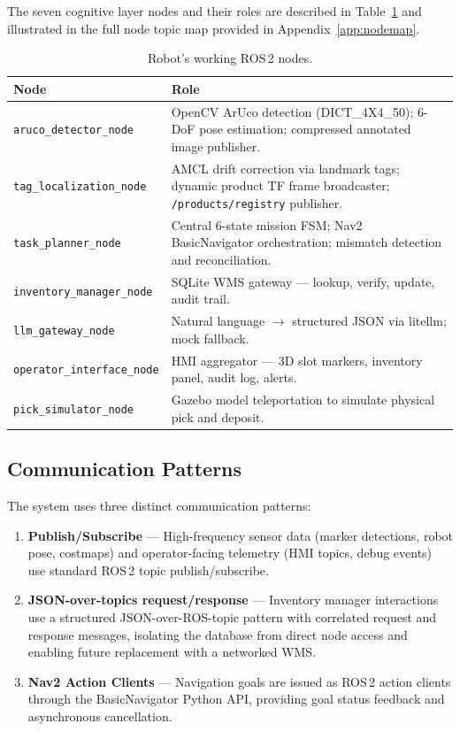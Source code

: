 \documentclass[12pt,a4paper]{report}
\begin{document}
The seven cognitive layer nodes and their roles are described in Table~\ref{tab:nodes} and illustrated in the full node topic map provided in Appendix~\ref{app:nodemap}.

\begin{table}[H]
\centering
\caption{Robot's working ROS\,2 nodes.}
\label{tab:nodes}
\begin{tabular}{p{6cm}>{\raggedright\arraybackslash}p{9cm}}
\toprule
\textbf{Node} & \textbf{Role} \\
\midrule
\texttt{aruco\_detector\_node} & OpenCV ArUco detection (DICT\_4X4\_50); 6-DoF pose estimation; compressed annotated image publisher. \\
\texttt{tag\_localization\_node} & AMCL drift correction via landmark tags; dynamic product TF frame broadcaster; \texttt{/products/registry} publisher. \\
\texttt{task\_planner\_node} & Central 6-state mission FSM; Nav2 BasicNavigator orchestration; mismatch detection and reconciliation. \\
\texttt{inventory\_manager\_node} & SQLite WMS gateway — lookup, verify, update, audit trail. \\
\texttt{llm\_gateway\_node} & Natural language $\rightarrow$ structured JSON via litellm; mock fallback. \\
\texttt{operator\_interface\_node} & HMI aggregator — 3D slot markers, inventory panel, audit log, alerts. \\
\texttt{pick\_simulator\_node} & Gazebo model teleportation to simulate physical pick and deposit. \\
\bottomrule
\end{tabular}
\end{table}

\subsection{Communication Patterns}

The system uses three distinct communication patterns:

\begin{enumerate}
    \item \textbf{Publish/Subscribe} — High-frequency sensor data (marker detections, robot pose, costmaps) and operator-facing telemetry (HMI topics, debug events) use standard ROS\,2 topic publish/subscribe.
    \item \textbf{JSON-over-topics request/response} — Inventory manager interactions use a structured JSON-over-ROS-topic pattern with correlated request and response messages, isolating the database from direct node access and enabling future replacement with a networked WMS.
    \item \textbf{Nav2 Action Clients} — Navigation goals are issued as ROS\,2 action clients through the BasicNavigator Python API, providing goal status feedback and asynchronous cancellation.
\end{enumerate}
\end{document}
